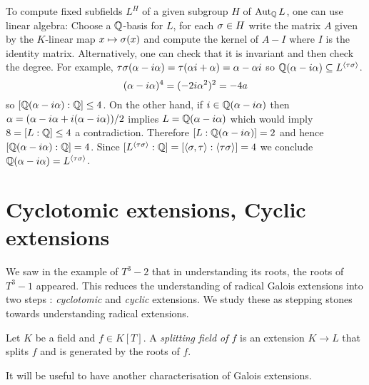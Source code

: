 \documentclass{article}
\begin{document}
\begin{eg}
\begin{cd}
    \arrow[from=2-3, to=1-3]
    \arrow[from=2-4, to=1-3]
    \arrow[from=2-5, to=1-3]
    \arrow[from=3-2, to=2-1]
    \arrow[from=3-2, to=2-2]
    \arrow[from=3-2, to=2-3]
    \arrow[from=3-3, to=2-3]
    \arrow[from=3-4, to=2-3]
    \arrow[from=3-4, to=2-4]
    \arrow[from=3-4, to=2-5]
    \arrow[from=4-3, to=3-2]
    \arrow[from=4-3, to=3-3]
    \arrow[from=4-3, to=3-4]
  \end{cd}
  To compute fixed subfields $L^H$ of a given subgroup $H$ of $\operatorname{Aut}_{\mathbb{Q}} L$,
  one can use linear algebra:
  Choose a $\mathbb{Q}$-basis for $L$,
  for each $\sigma \in H$
  write the matrix $A$ given by the $K$-linear map $x \mapsto \sigma(x)$
  and compute the kernel of $A - I$ where $I$ is the identity matrix.
  Alternatively, one can check that it is invariant and then check the degree.
  For example, $\tau\sigma(\alpha - i \alpha) = \tau(\alpha i + \alpha) = \alpha - \alpha i$
  so $\mathbb{Q}(\alpha - i \alpha) \subseteq L^{\langle \tau \sigma \rangle}$.
  \[
    (\alpha - i \alpha)^4 = (- 2 i \alpha^2)^2 = - 4 a
  \]
  so $[\mathbb{Q}(\alpha - i \alpha) : \mathbb{Q}] \leq 4$.
  On the other hand, if $i \in \mathbb{Q}(\alpha - i \alpha)$ then
  $\alpha = (\alpha - i \alpha + i (\alpha - i \alpha)) / 2$ implies
  $L = \mathbb{Q}(\alpha - i \alpha)$ which would imply $8 = [L : \mathbb{Q}] \leq 4$
  a contradiction.
  Therefore $[L : \mathbb{Q}(\alpha - i \alpha)] = 2$ and hence
  $[\mathbb{Q}(\alpha - i \alpha) : \mathbb{Q}] = 4$.
  Since $[L^{\langle \tau \sigma \rangle} : \mathbb{Q}] = [\langle \sigma , \tau \rangle : \langle \tau \sigma\rangle] = 4$
  we conclude $\mathbb{Q}(\alpha - i \alpha) = L^{\langle \tau \sigma \rangle}$.
\end{eg}

\section{Cyclotomic extensions, Cyclic extensions}

We saw in the example of $T^3 - 2$ that
in understanding its roots, the roots of $T^3 - 1$ appeared.
This reduces the understanding of radical Galois extensions
into two steps : \emph{cyclotomic} and \emph{cyclic} extensions.
We study these as stepping stones towards understanding 
radical extensions.

\begin{dfn}
  
  Let $K$ be a field and $f \in K[T]$.
  A \emph{splitting field of $f$} is an extension
  $K \to L$ that splits $f$ and is generated by the roots of $f$.
\end{dfn}
It will be useful to have another characterisation of Galois extensions.
\end{document}
